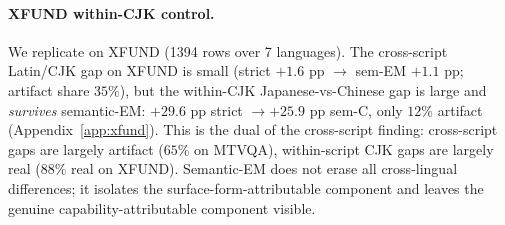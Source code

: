 \paragraph{XFUND within-CJK control.}
We replicate on XFUND (1394 rows over 7 languages). The cross-script Latin/CJK gap on XFUND is small (strict $+1.6$ pp $\to$ sem-EM $+1.1$ pp; artifact share $35\%$), but the within-CJK Japanese-vs-Chinese gap is large and \emph{survives} semantic-EM: $+29.6$ pp strict $\to +25.9$ pp sem-C, only $12\%$ artifact (Appendix~\ref{app:xfund}). This is the dual of the cross-script finding: cross-script gaps are largely artifact ($65\%$ on MTVQA), within-script CJK gaps are largely real ($88\%$ real on XFUND). Semantic-EM does not erase all cross-lingual differences; it isolates the surface-form-attributable component and leaves the genuine capability-attributable component visible.
